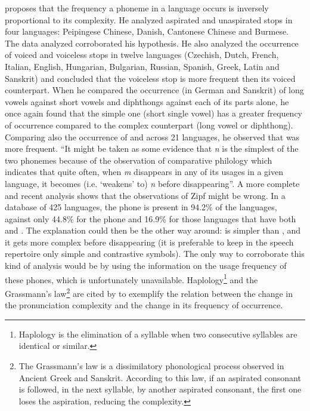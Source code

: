 \cite{zipf1949} proposes that the frequency a phoneme in a language occurs is inversely proportional to its complexity. He analyzed aspirated and 
unaspirated stops in four languages: Peipingese Chinese, Danish, Cantonese Chinese and Burmese. The data analyzed corroborated his hypothesis. 
He also analyzed the occurrence of voiced and voiceless stops in twelve languages (Czechish, Dutch, French, Italian, English, Hungarian, Bulgarian, 
Russian, Spanish, Greek, Latin and Sanskrit) and concluded that the voiceless stop is more frequent then its voiced counterpart. When he compared the 
occurrence (in German and Sanskrit) of long vowels against short vowels and diphthongs against each of its parts alone, he once again found that the 
simple one (short single vowel) has a greater frequency of occurrence compared to the complex counterpart (long vowel or diphthong). 
Comparing also the occurrence of \textipa{[m]} and \textipa{[n]} across 21 languages, he observed that \textipa{[n]} was more frequent. 
``It might be taken as some evidence that \textit{n} is the simplest of the two phonemes because of the observation of comparative philology 
which indicates that quite often, when \textit{m} disappears in any of its usages in a given language, it becomes (i.e. `weakens' to) \textit{n} 
before disappearing''\citep{zipf1949}. A more complete and recent analysis \citep{maddieson1884} shows that the observations of Zipf might be wrong. 
In a database of 425 languages, the phone \textipa{[m]} is present in 94.2\% of the languages, against only 44.8\% for the phone \textipa{[n]} and 
16.9\% for those languages that have both \textipa{[m]} and \textipa{[n]}.
The explanation could then be the other way around: \textipa{[m]} is simpler than \textipa{[n]}, and it gets more complex before disappearing 
(it is preferable to keep in the speech repertoire only simple and contrastive symbols). The only way to corroborate this kind of analysis would be by 
using the information on the usage frequency of these phones, which is unfortunately unavailable. Haplology\footnote{Haplology is the 
elimination of a syllable when two consecutive syllables are identical or similar.} and the Grassmann's law\footnote{The Grassmann's law is a dissimilatory 
phonological process observed in Ancient Greek and Sanskrit. According to this law, if an aspirated consonant is followed, in the next syllable, 
by another aspirated consonant, the first one loses the aspiration, reducing the complexity.} are cited by \cite{zipf1949} to exemplify the relation 
between the change in the pronunciation complexity  and the change in its frequency of occurrence.


